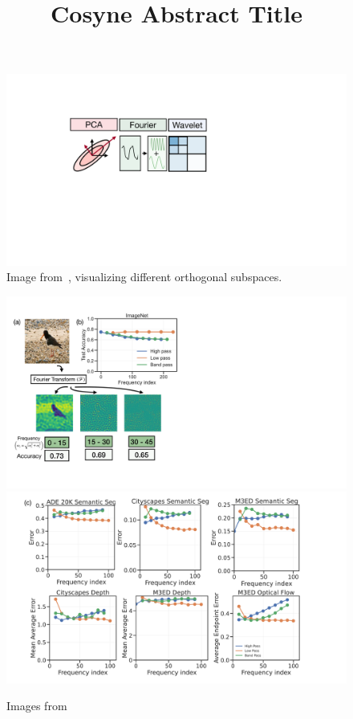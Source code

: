 \documentclass[12pt, letterpaper]{article}
\title{\color{custom}\large{\vspace{-1.5cm}%
    Cosyne Abstract Title}}
\date{}
\author{}
\begin{document}
\maketitle
\vspace*{-2cm}

\lipsum[0-3]

\vspace*{-0.2cm}
\hrulefill

\lipsum[4-5]
\begin{figure}
    \centering
    \includegraphics[width=\linewidth]{imgs/linear_cartoon.pdf}
    \caption{Image from~\citet{ramesh2024many}, visualizing different orthogonal subspaces.}
\end{figure}
\lipsum[6-8]

\begin{figure}[!htb]
    \vspace*{-1em}
    \centering
    \includegraphics[width=0.39\linewidth]{imgs/panel1.pdf}
    \includegraphics[width=0.55\linewidth]{imgs/panel2.pdf}
    \caption{Images from~\citet{ramesh2024many}}
\end{figure}
\lipsum[8-13]

{}

\end{document}

